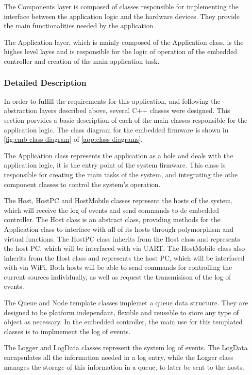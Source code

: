 \documentclass[10pt,twocolumn,letterpaper]{article}
\begin{document}
The Components layer is composed of classes responsible for implementing the interface between the application logic and the hardware devices.
They provide the main functionalities needed by the application.

The Application layer, which is mainly composed of the Application class, is the highes level layes and is responsible for the logic of operation of the embedded controller and creation of the main application task.

\subsubsection{Detailed Description}

In order to fulfill the requirements for this application, and following the abstraction layers described above, several C++ classes were designed.
This section porvides a basic description of each of the main classes responsible for the application logic.
The class diagram for the embedded firmware is shown in \autoref{fig:emb-class-diagram} of \autoref{app:class-diagrams}.

The Application class represents the application as a hole and deals with the application logic, it is the entry point of the system firmware.
This class is responsible for creating the main tasks of the system, and integrating the othe component classes to control the system's operation.

The Host, HostPC and HostMobile classes represent the hosts of the system, which will receive the log of events and send commands to de embedded controller.
The Host class is an abstract class, providing methods for the Application class to interface with all of its hosts through polymorphism and virtual functions.
The HostPC class inherits from the Host class and represents the host PC, which will be interfaced with via UART.
The HostMobile class also inherits from the Host class and represents the host PC, which will be interfaced with via WiFi.
Both hosts will be able to send commands for controlling the current sources individually, as well as request the transmisison of the log of events.

The Queue and Node template classes implemet a queue data structure.
They are designed to be platform independant, flexible and reuseble to store any type of object as necessary.
In the embedded controller, the main use for this templated classes is to implmement the log of events.

The Logger and LogData classes represent the system log of events.
The LogData encapsulates all the information needed in a log entry, while the Logger class manages the storage of this information in a queue, to later be sent to the hosts.
\end{document}
